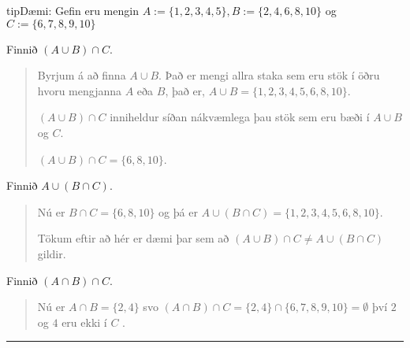 \documentclass[a4paper,10pt,icelandic]{sphinxmanual}
\begin{document}
\begin{sphinxadmonition}{tip}{Dæmi:}
Gefin eru mengin  \(A:= \{ 1,2,3,4,5 \}, B := \{ 2,4,6,8,10\}\) og \(C := \{ 6,7,8,9,10\}\)

 Finnið \((A \cup B) \cap C\).
\begin{quote}

Byrjum á að finna \(A \cup B\). Það er mengi allra staka sem eru stök í öðru hvoru mengjanna \(A\) eða \(B\), það er, \(A \cup B = \{1,2,3,4,5,6,8,10 \}\).

\((A \cup B) \cap C\) inniheldur síðan nákvæmlega þau stök sem eru bæði í \(A \cup B\) og \(C\).

\((A \cup B) \cap C = \{6,8,10 \}\).
\end{quote}

  Finnið \(A \cup (B \cap C)\).
\begin{quote}

Nú er \(B \cap C = \{6,8,10 \}\) og þá er \(A \cup (B \cap C) = \{1,2,3,4,5,6,8,10 \}\).

Tökum eftir að hér er dæmi þar sem að \((A \cup B) \cap C \neq A \cup (B  \cap C)\) gildir.
\end{quote}

 Finnið \((A \cap B) \cap C\).
\begin{quote}

Nú er \(A \cap B = \{ 2,4 \}\) svo \((A \cap B) \cap C = \{2,4 \} \cap \{6,7,8,9,10 \} = \emptyset\) því \(2\) og \(4\) eru ekki í \(C\) .
\end{quote}
\end{sphinxadmonition}


\bigskip\hrule\bigskip
\end{document}
